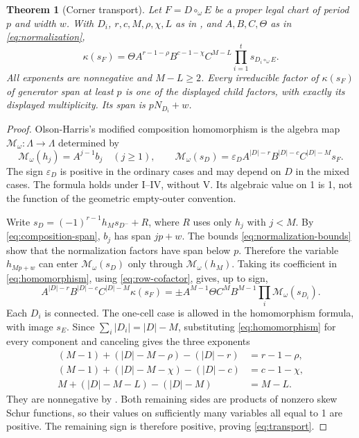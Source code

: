 \documentclass[11pt,a4paper]{amsart}
\numberwithin{equation}{section}
\theoremstyle{plain}
\newtheorem{theorem}{Theorem}[section]
\theoremstyle{definition}
\begin{document}
\begin{theorem}[Corner transport]\label{thm:transport}
Let \(F=D\circ_\omega E\) be a proper legal chart of period \(p\) and width \(w\).  With \(D_i\), \(r,c,M,\rho,\chi,L\) as in , and \(A,B,C,\Theta\) as in \eqref{eq:normalization},
\begin{equation}\label{eq:transport}
 \kappa(s_F)=
 \Theta A^{r-1-\rho}B^{c-1-\chi}C^{M-L}
 \prod_{i=1}^t s_{D_i\circ_\omega E}.
\end{equation}
All exponents are nonnegative and \(M-L\ge2\).  Every irreducible factor of \(\kappa(s_F)\) of generator span at least \(p\) is one of the displayed child factors, with exactly its displayed multiplicity.  Its span is \(pN_{D_i}+w\).
\end{theorem}
\begin{proof}
Olson-Harris's modified composition homomorphism \cite[Thm.~5.6.1 and Prop.~5.6.3]{OlsonHarris2024HopfApplications} is the algebra map \(\mathcal M_\omega:\Lambda\to\Lambda\) determined by
\begin{equation}\label{eq:homomorphism}
 \mathcal M_\omega(h_j)=A^{j-1}b_j\quad(j\ge1),\qquad
 \mathcal M_\omega(s_D)=\varepsilon_D
 A^{|D|-r}B^{|D|-c}C^{|D|-M}s_F.
\end{equation}
The sign \(\varepsilon_D\) is positive in the ordinary cases and may depend on \(D\) in the mixed cases.  The formula holds under I--IV, without V.  Its algebraic value on 1 is 1, not the function of the geometric empty-outer convention.

Write \(s_D=(-1)^{r-1}h_Ms_{D^-}+R\), where \(R\) uses only \(h_j\) with \(j<M\).  By \eqref{eq:composition-span}, \(b_j\) has span \(jp+w\).  The bounds \eqref{eq:normalization-bounds} show that the normalization factors have span below \(p\).  Therefore the variable \(h_{Mp+w}\) can enter \(\mathcal M_\omega(s_D)\) only through \(\mathcal M_\omega(h_M)\).  Taking its coefficient in \eqref{eq:homomorphism}, using \eqref{eq:row-cofactor}, gives, up to sign,
\begin{equation}\label{eq:coefficient-transport}
 A^{|D|-r}B^{|D|-c}C^{|D|-M}\kappa(s_F)
 =\pm A^{M-1}\Theta C^M B^{M-1}
       \prod_i\mathcal M_\omega(s_{D_i}).
\end{equation}
Each \(D_i\) is connected.  The one-cell case is allowed in the homomorphism formula, with image \(s_E\).  Since \(\sum_i|D_i|=|D|-M\), substituting \eqref{eq:homomorphism} for every component and canceling gives the three exponents
\begin{equation*}
 \begin{split}
 (M-1)+(|D|-M-\rho)-(|D|-r)&=r-1-\rho,\\
 (M-1)+(|D|-M-\chi)-(|D|-c)&=c-1-\chi,\\
 M+(|D|-M-L)-(|D|-M)&=M-L.
 \end{split}
\end{equation*}
They are nonnegative by .  Both remaining sides are products of nonzero skew Schur functions, so their values on sufficiently many variables all equal to 1 are positive.  The remaining sign is therefore positive, proving \eqref{eq:transport}.


\end{proof}
\end{document}
